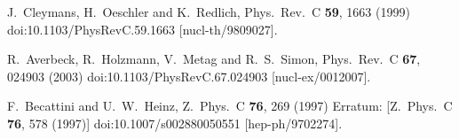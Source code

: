 \documentclass[12pt]{article}
\begin{document}
\begin{thebibliography}{99}
  J.~Cleymans, H.~Oeschler and K.~Redlich,
  Phys.\ Rev.\ C {\bf 59}, 1663 (1999)
  doi:10.1103/PhysRevC.59.1663
  [nucl-th/9809027].

  R.~Averbeck, R.~Holzmann, V.~Metag and R.~S.~Simon,
  Phys.\ Rev.\ C {\bf 67}, 024903 (2003)
  doi:10.1103/PhysRevC.67.024903
  [nucl-ex/0012007].
	
  F.~Becattini and U.~W.~Heinz,
  Z.\ Phys.\ C {\bf 76}, 269 (1997)
  Erratum: [Z.\ Phys.\ C {\bf 76}, 578 (1997)]
  doi:10.1007/s002880050551
  [hep-ph/9702274].

\end{thebibliography}
\end{document}
